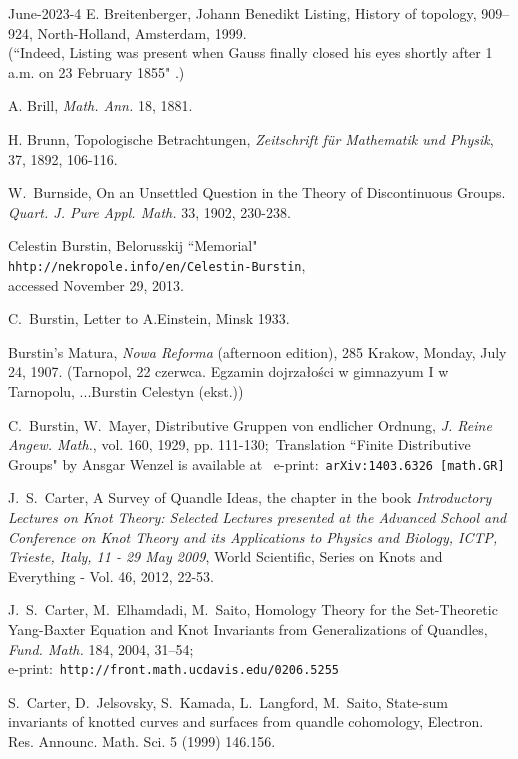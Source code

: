 \documentclass[12pt]{amsart}
\begin{document}
\begin{thebibliography}{June-2023-4}
E. Breitenberger,
Johann Benedikt Listing, History of topology, 909--924, North-Holland,
Amsterdam, 1999.\\
(``Indeed, Listing was present when Gauss finally closed his eyes shortly after  1 a.m. on 23 February 1855" \cite{Bre1}.)

A. Brill, {\it Math. Ann.} 18, 1881.

H. Brunn, Topologische Betrachtungen,
{\it Zeitschrift f\"ur Mathematik und Physik}, 37, 1892, 106-116.



W.~Burnside, On an Unsettled Question in the Theory of
Discontinuous Groups. \textit{Quart. J. Pure Appl. Math.} 33, 1902, 230-238.

 Celestin Burstin, Belorusskij ``Memorial" \\
 {\tt  hhtp://nekropole.info/en/Celestin-Burstin},\\
accessed November 29, 2013.

 C.~Burstin, Letter to A.Einstein, Minsk 1933.

 Burstin's Matura,
{\it Nowa Reforma} (afternoon edition), 285
Krakow, Monday, July 24, 1907.
(Tarnopol, 22 czerwca. Egzamin dojrza{\l}o\'sci w gimnazyum I w Tarnopolu, ...Burstin Celestyn (ekst.))

C.~Burstin, W.~Mayer, Distributive Gruppen von endlicher Ordnung,
{\it J. Reine Angew.  Math.}, vol. 160, 1929, pp. 111-130;\
Translation ``Finite Distributive Groups" by Ansgar Wenzel is available at \
e-print:\ {\tt  arXiv:1403.6326 [math.GR]}

J.~S.~Carter, A Survey of Quandle Ideas,
the chapter in the book {\it Introductory Lectures on Knot Theory:
Selected Lectures presented at the Advanced School and Conference on Knot
Theory and its Applications to Physics and Biology, ICTP, Trieste, Italy,
11 - 29 May 2009}, World Scientific, Series on Knots and Everything - Vol. 46, 2012, 22-53.

\bibitem[CES]{CES}
J.~S.~Carter, M.~Elhamdadi, M.~Saito,
Homology Theory for the Set-Theoretic Yang-Baxter Equation and Knot Invariants from Generalizations of Quandles,
{\it Fund. Math.} 184, 2004, 31--54;\\
e-print:\ {\tt  http://front.math.ucdavis.edu/0206.5255 }

S.~Carter, D.~Jelsovsky, S.~Kamada, L.~Langford, M.~Saito, State-sum invariants of knotted curves and surfaces
from quandle cohomology, Electron. Res. Announc. Math. Sci. 5 (1999) 146.156.


\end{thebibliography}
\end{document}
